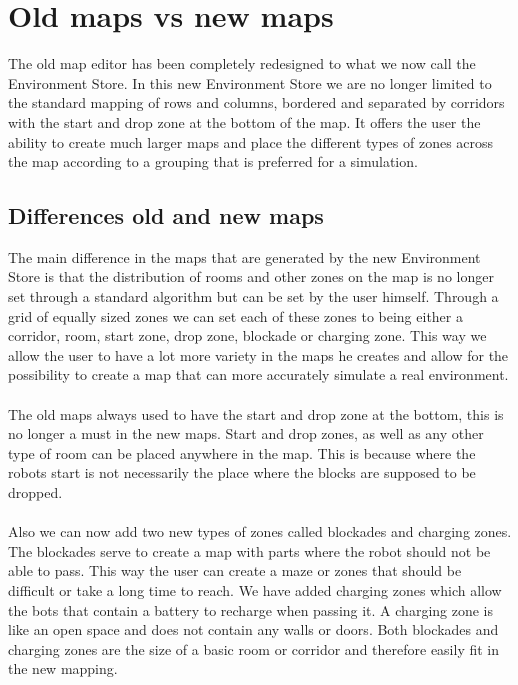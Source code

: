 \section{Old maps vs new maps}
The old map editor has been completely redesigned to what we now call the Environment Store. 
In this new Environment Store we are no longer limited to the standard mapping of rows and columns, 
bordered and separated by corridors with the start and drop zone at the bottom of the map. 
It offers the user the ability to create much larger maps and place the different types of zones 
across the map according to a grouping that is preferred for a simulation.

\subsection{Differences old and new maps}
The main difference in the maps that are generated by the new Environment Store is that the distribution
of rooms and other zones on the map is no longer set through a standard algorithm but can be set by the user himself.
Through a grid of equally sized zones we can set each of these zones to being either a corridor, room, start zone, drop zone, blockade or charging zone.
This way we allow the user to have a lot more variety in the maps he creates and allow for the possibility to
create a map that can more accurately simulate a real environment.
\\
\\
The old maps always used to have the start and drop zone at the bottom, this is no longer a must in the new maps.
Start and drop zones, as well as any other type of room can be placed anywhere in the map. This is because where the
robots start is not necessarily the place where the blocks are supposed to be dropped.
\\
\\
Also we can now add two new types of zones called blockades and charging zones. 
The blockades serve to create a map with parts where the robot should not be able to pass.
 This way the user can create a maze or zones that should be difficult or take a long time to reach. 
We have added charging zones which allow the bots that contain a battery to recharge when passing it. 
A charging zone is like an open space and does not contain any walls or doors. Both blockades and 
charging zones are the size of a basic room or corridor and therefore easily fit in the new mapping.


